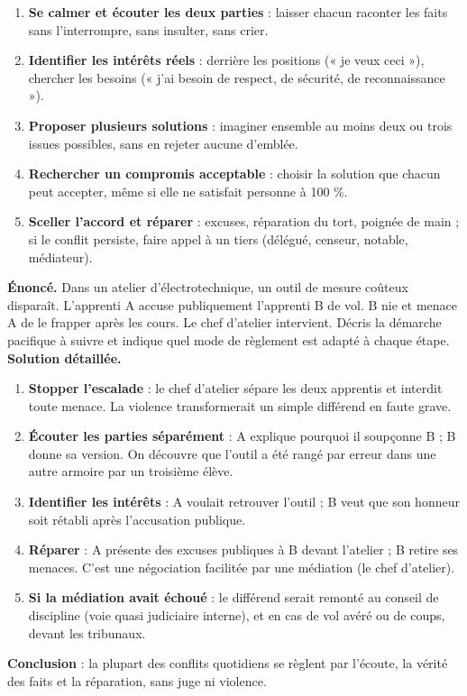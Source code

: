 \documentclass[11pt]{article}
\newcommand{\cle}[1]{{\popxbold\color{popdark}#1}}
\begin{document}
\begin{methode}
\begin{enumerate}
\item \textbf{Se calmer et écouter les deux parties} : laisser chacun raconter les faits sans l'interrompre, sans insulter, sans crier.
\item \textbf{Identifier les intérêts réels} : derrière les positions (« je veux ceci »), chercher les besoins (« j'ai besoin de respect, de sécurité, de reconnaissance »).
\item \textbf{Proposer plusieurs solutions} : imaginer ensemble au moins deux ou trois issues possibles, sans en rejeter aucune d'emblée.
\item \textbf{Rechercher un compromis acceptable} : choisir la solution que chacun peut accepter, même si elle ne satisfait personne à 100 \%.
\item \textbf{Sceller l'accord et réparer} : excuses, réparation du tort, poignée de main ; si le conflit persiste, faire appel à un tiers (délégué, censeur, notable, médiateur).
\end{enumerate}
\end{methode}

\begin{exoresolu}
\textbf{Énoncé.} Dans un atelier d'électrotechnique, un outil de mesure coûteux disparaît. L'apprenti A accuse publiquement l'apprenti B de vol. B nie et menace A de le frapper après les cours. Le chef d'atelier intervient. Décris la démarche pacifique à suivre et indique quel mode de règlement est adapté à chaque étape.
\tcblower
\textbf{Solution détaillée.}
\begin{enumerate}
\item \textbf{Stopper l'escalade} : le chef d'atelier sépare les deux apprentis et interdit toute menace. La violence transformerait un simple différend en faute grave.
\item \textbf{Écouter les parties séparément} : A explique pourquoi il soupçonne B ; B donne sa version. On découvre que l'outil a été rangé par erreur dans une autre armoire par un troisième élève.
\item \textbf{Identifier les intérêts} : A voulait retrouver l'outil ; B veut que son honneur soit rétabli après l'accusation publique.
\item \textbf{Réparer} : A présente des excuses publiques à B devant l'atelier ; B retire ses menaces. C'est une \cle{négociation} facilitée par une \cle{médiation} (le chef d'atelier).
\item \textbf{Si la médiation avait échoué} : le différend serait remonté au conseil de discipline (voie quasi judiciaire interne), et en cas de vol avéré ou de coups, devant les tribunaux.
\end{enumerate}
\textbf{Conclusion} : la plupart des conflits quotidiens se règlent par l'écoute, la vérité des faits et la réparation, sans juge ni violence.
\end{exoresolu}
\end{document}
